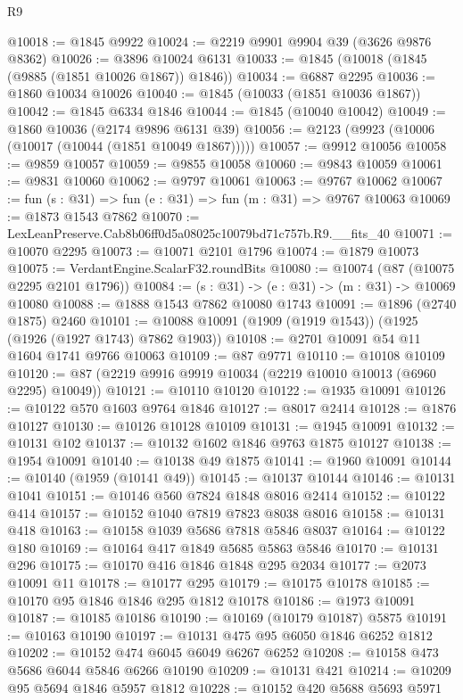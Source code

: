 \begin{lexlean}{R9}
\begin{coremodule}
@10018 := @1845 @9922
@10024 := @2219 @9901 @9904 @39 (@3626 @9876 @8362)
@10026 := @3896 @10024 @6131
@10033 := @1845 (@10018 (@1845 (@9885 (@1851 @10026 @1867)) @1846))
@10034 := @6887 @2295
@10036 := @1860 @10034 @10026
@10040 := @1845 (@10033 (@1851 @10036 @1867))
@10042 := @1845 @6334 @1846
@10044 := @1845 (@10040 @10042)
@10049 := @1860 @10036 (@2174 @9896 @6131 @39)
@10056 := @2123 (@9923 (@10006 (@10017 (@10044 (@1851 @10049 @1867)))))
@10057 := @9912 @10056
@10058 := @9859 @10057
@10059 := @9855 @10058
@10060 := @9843 @10059
@10061 := @9831 @10060
@10062 := @9797 @10061
@10063 := @9767 @10062
@10067 := fun (s : @31) => fun (e : @31) => fun (m : @31) => @9767 @10063
@10069 := @1873 @1543 @7862
@10070 := LexLeanPreserve.Cab8b06ff0d5a08025c10079bd71c757b.R9.__fits_40
@10071 := @10070 @2295
@10073 := @10071 @2101 @1796
@10074 := @1879 @10073
@10075 := VerdantEngine.ScalarF32.roundBits
@10080 := @10074 (@87 (@10075 @2295 @2101 @1796))
@10084 := (s : @31) -> (e : @31) -> (m : @31) -> @10069 @10080
@10088 := @1888 @1543 @7862 @10080 @1743
@10091 := @1896 (@2740 @1875) @2460
@10101 := @10088 @10091 (@1909 (@1919 @1543)) (@1925 (@1926 (@1927 @1743) @7862 @1903))
@10108 := @2701 @10091 @54 @11 @1604 @1741 @9766 @10063
@10109 := @87 @9771
@10110 := @10108 @10109
@10120 := @87 (@2219 @9916 @9919 @10034 (@2219 @10010 @10013 (@6960 @2295) @10049))
@10121 := @10110 @10120
@10122 := @1935 @10091
@10126 := @10122 @570 @1603 @9764 @1846
@10127 := @8017 @2414
@10128 := @1876 @10127
@10130 := @10126 @10128 @10109
@10131 := @1945 @10091
@10132 := @10131 @102
@10137 := @10132 @1602 @1846 @9763 @1875 @10127
@10138 := @1954 @10091
@10140 := @10138 @49 @1875
@10141 := @1960 @10091
@10144 := @10140 (@1959 (@10141 @49))
@10145 := @10137 @10144
@10146 := @10131 @1041
@10151 := @10146 @560 @7824 @1848 @8016 @2414
@10152 := @10122 @414
@10157 := @10152 @1040 @7819 @7823 @8038 @8016
@10158 := @10131 @418
@10163 := @10158 @1039 @5686 @7818 @5846 @8037
@10164 := @10122 @180
@10169 := @10164 @417 @1849 @5685 @5863 @5846
@10170 := @10131 @296
@10175 := @10170 @416 @1846 @1848 @295 @2034
@10177 := @2073 @10091 @11
@10178 := @10177 @295
@10179 := @10175 @10178
@10185 := @10170 @95 @1846 @1846 @295 @1812 @10178
@10186 := @1973 @10091
@10187 := @10185 @10186
@10190 := @10169 (@10179 @10187) @5875
@10191 := @10163 @10190
@10197 := @10131 @475 @95 @6050 @1846 @6252 @1812
@10202 := @10152 @474 @6045 @6049 @6267 @6252
@10208 := @10158 @473 @5686 @6044 @5846 @6266 @10190
@10209 := @10131 @421
@10214 := @10209 @95 @5694 @1846 @5957 @1812
@10228 := @10152
    @420
    @5688
    @5693
    @5971

\end{coremodule}
\end{lexlean}
